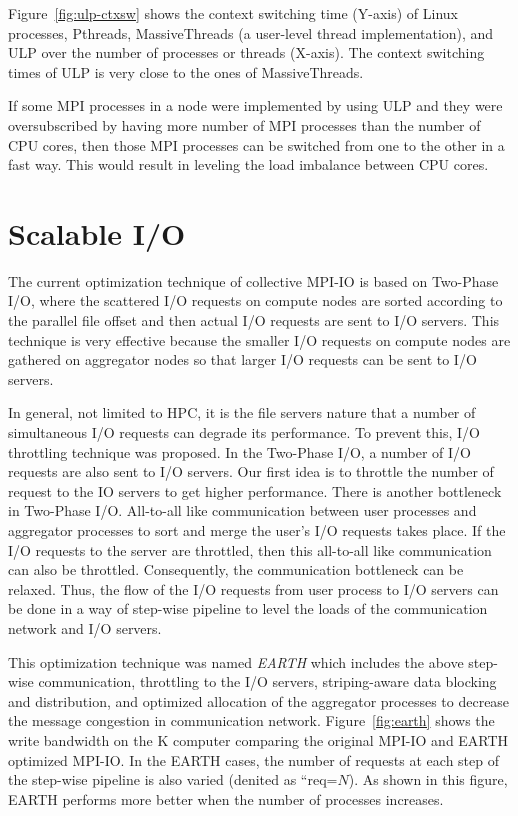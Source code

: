Figure~\ref{fig:ulp-ctxsw} shows the context switching time (Y-axis)
of Linux processes, Pthreads, MassiveThreads\cite{Nakashima2014} (a
user-level thread implementation), and ULP over the number of
processes or threads (X-axis). The context switching times of ULP is
very close to the ones of MassiveThreads.

If some MPI processes in a node were implemented by using ULP and they
were oversubscribed by having more number of MPI processes than the
number of CPU cores, then those MPI processes can be switched from one
to the other in a fast way. This would result in leveling the load
imbalance between CPU cores. 

\section{Scalable I/O}

The current optimization technique of collective MPI-IO\cite{romio} is
based on Two-Phase I/O\cite{two-phase}, where the scattered I/O
requests on compute nodes are 
sorted according to the parallel file offset and then actual I/O
requests are sent to I/O servers. This technique is very effective
because the smaller I/O requests on compute nodes are gathered on
aggregator nodes so that larger I/O requests can be sent to I/O
servers. 

In general, not limited to HPC, it is the file servers nature that a
number of simultaneous I/O requests can degrade its performance. To
prevent this, I/O throttling technique was proposed. In the Two-Phase
I/O, a number of I/O requests are also sent to I/O servers. Our first
idea is to throttle the number of request to the IO servers to get
higher performance. There is another bottleneck in Two-Phase
I/O. All-to-all like communication between user processes and
aggregator processes to sort and merge the user's I/O requests takes
place. If the I/O requests to the server are throttled, then this
all-to-all like communication can also be throttled. Consequently, the
communication bottleneck can be relaxed. Thus, the flow  
of the I/O requests from user process to I/O servers can be done in a
way of step-wise pipeline to level the loads of the communication
network and I/O servers.

This optimization technique was named {\em EARTH} which includes the
above step-wise communication, throttling to the I/O servers,
striping-aware data blocking and distribution, and 
optimized allocation of the aggregator processes to decrease the message
congestion in communication
network\cite{tsujita:WS_EuroMPI2014,tsujita:hpcasia18}. 
Figure~\ref{fig:earth} shows the 
write bandwidth on the K computer\cite{k-computer} comparing the
original MPI-IO and 
EARTH optimized MPI-IO. In the EARTH cases, the number of requests at
each step of the step-wise pipeline is also varied (denited as
``req=$N$). As shown in this figure, EARTH performs more better when
the number of processes increases. 

